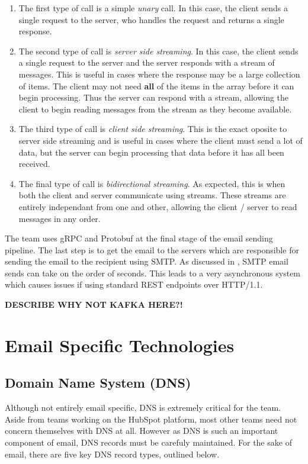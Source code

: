 \begin{enumerate}
  \item{The first type of call is a simple \textit{unary} call. In this case, the client sends a single request to the server, who handles the request and returns a single response.}
  \item{The second type of call is \textit{server side streaming}. In this case, the client sends a single request to the server and the server responds with a stream of messages. This is useful in cases where the response may be a large collection of items. The client may not need \textbf{all} of the items in the array before it can begin processing. Thus the server can respond with a stream, allowing the client to begin reading messages from the stream as they become available.}
  \item{The third type of call is \textit{client side streaming}. This is the exact oposite to server side streaming and is useful in cases where the client must send a lot of data, but the server can begin processing that data before it has all been received.}
  \item{The final type of call is \textit{bidirectional streaming}. As expected, this is when both the client and server communicate using streams. These streams are entirely independant from one and other, allowing the client / server to read messages in any order.}
\end{enumerate}

The \team{} team uses gRPC and Protobuf at the final stage of the email sending pipeline. The last step is to get the email to the servers which are responsible for sending the email to the recipient using SMTP. As discussed in , SMTP email sends can take on the order of seconds. This leads to a very asynchronous system which causes issues if using standard REST endpoints over HTTP/1.1. \hfill

\textbf{DESCRIBE WHY NOT KAFKA HERE?!}
\vfill

\section{Email Specific Technologies}
\subsection{Domain Name System (DNS)} \label{sec:DNS}

Although not entirely email specific, DNS is extremely critical for the \team{} team. Aside from teams working on the HubSpot platform, most other teams need not concern themselves with DNS at all. However as DNS is such an important component of email, DNS records must be carefuly maintained. For the sake of email, there are five key DNS record types, outlined below.

